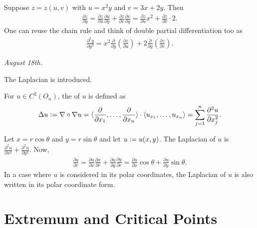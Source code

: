 \begin{example}
    Suppose $z = z(u,v)$ with $u = x^{2}y$ and $v = 3x + 2y$. Then
    \begin{align}
        \frac{\partial z}{\partial y} = \frac{\partial z}{\partial u} \frac{\partial u}{\partial y} + \frac{\partial z}{\partial v} \frac{\partial v}{\partial y} = \frac{\partial z}{\partial u} x^{2} + \frac{\partial z}{\partial v} \cdot 2.
    \end{align}
    One can reuse the chain rule and think of double partial differentiation too as
    \begin{align}
        \frac{\partial^{2}y}{\partial y^{2}} = x^{2}\frac{\partial}{\partial y} \left( \frac{\partial z}{\partial u} \right) + 2 \frac{\partial}{\partial y} \left( \frac{\partial z}{\partial v} \right).
    \end{align}
\end{example}
\noindent \textit{August 18th.}

The Laplacian is introduced.

\begin{definition}
    For $u \in C^{2}(O_{n})$, the  of $u$ is defined as
    \begin{align}
        \Delta u \vcentcolon= \nabla \circ \nabla u = \langle\frac{\partial}{\partial x_{1}}, \ldots, \frac{\partial}{\partial x_{n}}\rangle \cdot \langle u_{x_{1}},\ldots,u_{x_{n}}\rangle = \sum_{j=1}^{n} \frac{\partial^{2} u}{\partial x_{j}^{2}}.
    \end{align}
\end{definition}

\begin{example}
    Let $x = r \cos \theta$ and $y = r \sin \theta$ and let $u \vcentcolon= u(x,y)$. The Laplacian of $u$ is $\frac{\partial^{2}u}{\partial x^{2}} + \frac{\partial^{2}u}{\partial y^{2}}$. Now,
    \begin{align}
        \frac{\partial u}{\partial r} = \frac{\partial u}{\partial x} \frac{\partial x}{\partial r} + \frac{\partial u}{\partial y} \frac{\partial y}{\partial r} = \frac{\partial u}{\partial x} \cos \theta + \frac{\partial u}{\partial y} \sin \theta.
    \end{align}
    In a case where $u$ is considered in its polar coordinates, the Laplacian of $u$ is also written in its polar coordinate form.
\end{example}

\section{Extremum and Critical Points}

